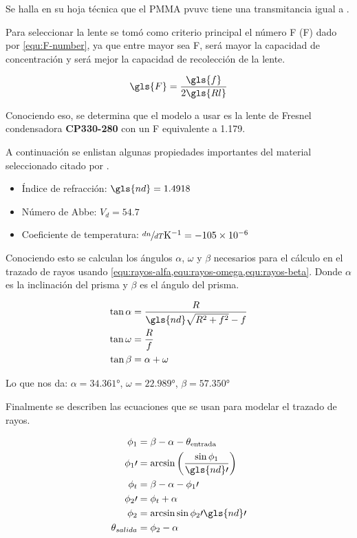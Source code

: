 		Se halla en su hoja técnica que el PMMA \acrshort{pvuvc} tiene una transmitancia igual a .
		
		Para seleccionar la lente se tomó como criterio principal el número F (\gls{F}) dado por \eqref{equ:F-number}, ya que entre mayor sea \gls{F}, será mayor la capacidad de concentración y será mejor la capacidad de recolección de la lente.
		
		\begin{equation}\label{equ:F-number}
			\gls{F} = \dfrac{\gls{f}}{2\gls{Rl}}
		\end{equation}
		
		Conociendo eso, se determina que el modelo a usar es la lente de Fresnel condensadora \textbf{CP330-280} con un \gls{F} equivalente a \num{1.179}. 
		
		A continuación se enlistan algunas propiedades importantes del material seleccionado \cite{shannon_art_1997} citado por \cite{leutz_nonimaging_2001}.
		
		\begin{itemize}
			\item Índice de refracción: $\gls{nd} = 1.4918$
			\item Número de Abbe: $V_d = 54.7$
			\item Coeficiente de temperatura: $\sfrac{dn}{dT} \unit{\per\kelvin} = \num{-105e-6}$
		\end{itemize}
		
		Conociendo esto se calculan los ángulos $\alpha$, $\omega$ y $\beta$ necesarios para el cálculo en el trazado de rayos usando \cref{equ:rayos-alfa,equ:rayos-omega,equ:rayos-beta}. Donde $\alpha$ es la inclinación del prisma y $\beta$ es el ángulo del prisma.
		
		\begin{align}
			\tan\alpha &= \dfrac{R}{\gls{nd}\sqrt{R^{2}+f^{2}} - f} \label{equ:rayos-alfa}\\
			\tan\omega &= \dfrac{R}{f} \label{equ:rayos-omega}\\
			\tan\beta &= \alpha + \omega \label{equ:rayos-beta}
		\end{align}
		
		Lo que nos da: $\alpha= \ang{34.361}$, $\omega = \ang{22.989}$, $\beta= \ang{57.350}$
		
		Finalmente se describen las ecuaciones que se usan para modelar el trazado de rayos.
		
		\begin{align}
			\phi_{1} &= \beta - \alpha - \theta_{\text{entrada}}\\
			\phi_{1}\prime &= \arcsin\left(\dfrac{\sin\phi_{1}}{\gls{nd}\prime}\right)\\
			\phi_{t} &= \beta - \alpha - \phi_{1}\prime\\
			\phi_{2}\prime &= \phi_{t} + \alpha\\
			\phi_{2} &= \arcsin{\sin\phi_{2}\prime\gls{nd}\prime}\\
			\theta_{salida} &= \phi_{2} - \alpha
		\end{align}
		
